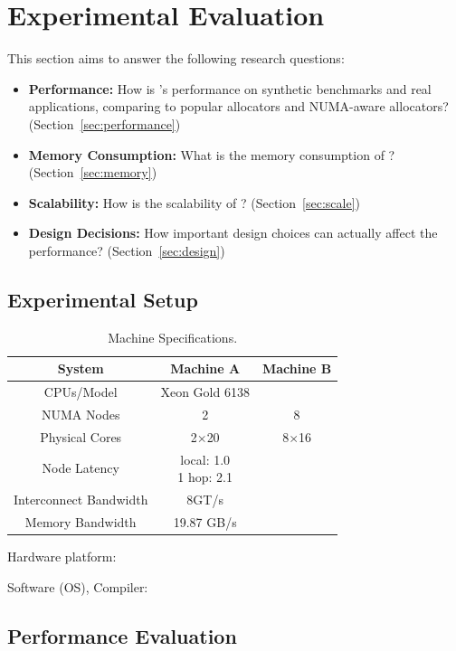 \section{Experimental Evaluation}

This section aims to answer the following research questions: 

\begin{itemize}
\item \textbf{Performance:} How is \NM{}'s performance on synthetic benchmarks and real applications, comparing to popular allocators and NUMA-aware allocators? (Section~\ref{sec:performance}) 
\item \textbf{Memory Consumption:} What is the memory consumption of \NM{}? (Section~\ref{sec:memory})
\item \textbf{Scalability:} How is the scalability of \NM{}? (Section~\ref{sec:scale})
\item \textbf{Design Decisions:} How important design choices can actually affect the performance? (Section~\ref{sec:design})	
\end{itemize}

\subsection{Experimental Setup}
\begin{table}[h]
  \footnotesize
  \setlength{\tabcolsep}{1.0em}
\begin{tabular}{c c c}
\hline
System & \textbf{Machine A} & \textbf{Machine B} \\ \hline
CPUs/Model & Xeon Gold 6138	& \\ \hline
NUMA Nodes & 2 & 8 \\ \hline
Physical Cores & 2$\times$20 & 8$\times$16 \\ \hline
Node Latency & \specialcell{local: 1.0 \\ 1 hop: 2.1} & \\ \hline
Interconnect Bandwidth & 8GT/s & \\ \hline
Memory Bandwidth & 19.87 GB/s & \\ \hline
  \end{tabular}
  \centering
  \caption{Machine Specifications.\label{table:Machine}}
\end{table}


Hardware platform:

Software (OS), Compiler: 

\subsection{Performance Evaluation}

